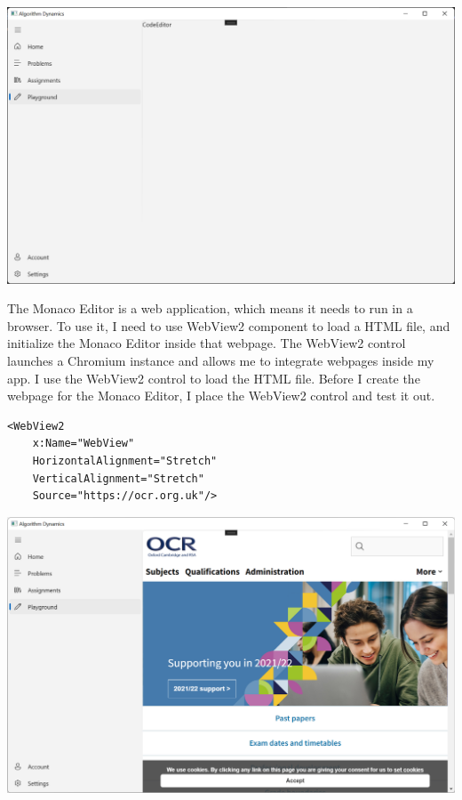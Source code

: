 \documentclass[a4paper]{report}
\begin{document}
\includegraphics[width=\textwidth, height=\textheight, keepaspectratio]{CodeEditorControl}

The Monaco Editor is a web application, which means it needs to run in a browser. To use it, I need to use WebView2 component to load a HTML file, and initialize the Monaco Editor inside that webpage. The WebView2 control launches a Chromium instance and allows me to integrate webpages inside my app. I use the WebView2 control to load the HTML file. Before I create the webpage for the Monaco Editor, I place the WebView2 control and test it out.

\begin{verbatim}
<WebView2 
    x:Name="WebView"
    HorizontalAlignment="Stretch"
    VerticalAlignment="Stretch"
    Source="https://ocr.org.uk"/>
\end{verbatim}

\includegraphics[width=\textwidth, height=\textheight, keepaspectratio]{PlaygroundPage-WebView2-Webpage}
\end{document}
